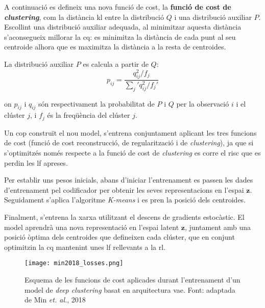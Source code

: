 \documentclass[CAT,BIB]{TFUOC}%
\begin{document}
        A continuació es defineix una nova funció de cost,
        la \textbf{funció de cost de \textit{clustering}},
        com la distància \gls{kl} entre la distribució $Q$
        i una distribució auxiliar $P$.
        Escollint una distribució auxiliar adequada,
        al minimitzar aquesta distància
        s'aconsegueix millorar la \gls{cq}:
        es minimitza la distància de cada punt al seu centroide
        alhora que es maximitza la distància a la resta de centroides.

        La distribució auxiliar $P$ es calcula
        a partir de $Q$:
        \begin{equation}
            \label{eq:clustering_aux}
            p_{ij} =
            \frac {q_{ij}^2 / f_j}
                 {\sum_j' q_{ij}^2 / f_j'}
        \end{equation}

        on $p_{ij}$ i $q_{ij}$ són respectivament la probabilitat
        de $P$ i $Q$ per la observació $i$ i el clúster $j$,
        i $f_j$ és la freqüència del clúster $j$.

        Un cop construït el nou model,
        s'entrena conjuntament aplicant les tres funcions de cost
        (funció de cost reconstrucció, de regularització i de \textit{clustering}),
        ja que si s'optimitzés només respecte a la funció de cost de \textit{clustering}
        es corre el risc que es perdin les \gls{lf} apreses.

        Per establir uns pesos inicials,
        abans d'iniciar l'entrenament
        es passen les dades d'entrenament pel codificador
        per obtenir les seves representacions en l'espai $\mathbf{z}$.
        Seguidament s'aplica l'algoritme \textit{K-means}
        i es pren la posició dels centroides.

        Finalment, s'entrena la xarxa utilitzant el descens de gradients estocàstic.
        El model aprendrà una nova representació en l'espai latent $\mathbf{z}$,
        juntament amb una posició òptima dels centroides que defineixen cada clúster,
        que en conjunt optimitzin la \gls{cq}
        mantenint unes \gls{lf} rellevants a la \gls{rl}.

        \begin{figure}
            \centering
            \texttt{[image: min2018\_losses.png]}
            \caption[\textit{Variational autoencoder} + clustering: funcions de cost]{
                Esquema de les funcions de cost
                aplicades durant l'entrenament
                d'un model de \textit{deep clustering}
                basat en arquitectura \gls{vae}.
                Font: adaptada de Min \textit{et. al.}, 2018 \citep{Min2018}
            }
            \label{fig:vae_losses}
        \end{figure}
\end{document}
